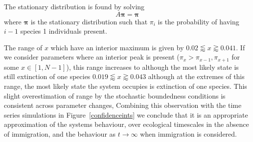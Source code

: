 \documentclass[a4paper]{article}
\begin{document}
The stationary distribution is found by solving
\begin{equation}
A \mathbf{\pi} = \mathbf{\pi}
\end{equation}
where $\mathbf{\pi}$ is the stationary distribution such that $\pi_i$ is the probability of having $i-1$ species 1 individuals present. 

The range of $x$ which have an interior maximum is given by $0.02 \lessapprox x \gtrapprox 0.041$. If we consider parameters where an interior peak is present ($\pi_x > \pi_{x-1},\pi_{x+1}$ for some $x \in [1, N-1]$), this range increases to  although the most likely state is still extinction of one species $0.019 \lessapprox x \gtrapprox 0.043$ although at the extremes of this range, the most likely state the system occupies is extinction of one species. This slight overestimation of range by the stochastic boundedness conditions is consistent across parameter changes, Combining this observation with the time series simulations in Figure~\ref{confidenceints}  we conclude that it is an appropriate approximation of the systems behaviour, over ecological timescales in the absence of immigration, and the behaviour as $t \to \infty$ when immigration is considered.
   
\end{document}
